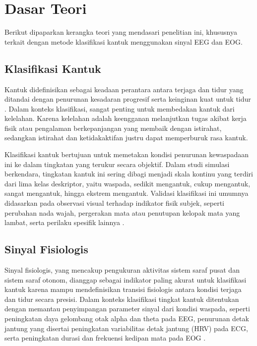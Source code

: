 \section{Dasar Teori} \label{II.Teori}
Berikut dipaparkan kerangka teori yang mendasari penelitian ini, khususnya terkait dengan metode klasifikasi kantuk menggunakan sinyal EEG dan EOG. \par

\subsection{Klasifikasi Kantuk} \label{II.Teori1}
Kantuk didefinisikan sebagai keadaan perantara antara terjaga dan tidur yang ditandai dengan penurunan kesadaran progresif serta keinginan kuat untuk tidur \cite{slater2008definition}. Dalam konteks klasifikasi, sangat penting untuk membedakan kantuk dari kelelahan. Karena kelelahan adalah keengganan melanjutkan tugas akibat kerja fisik atau pengalaman berkepanjangan yang membaik dengan istirahat, sedangkan istirahat dan ketidakaktifan justru dapat memperburuk rasa kantuk.

Klasifikasi kantuk bertujuan untuk memetakan kondisi penurunan kewaspadaan ini ke dalam tingkatan yang terukur secara objektif. Dalam studi simulasi berkendara, tingkatan kantuk ini sering dibagi menjadi skala kontinu yang terdiri dari lima kelas deskriptor, yaitu waspada, sedikit mengantuk, cukup mengantuk, sangat mengantuk, hingga ekstrem mengantuk. Validasi klasifikasi ini umumnya didasarkan pada observasi visual terhadap indikator fisik subjek, seperti perubahan nada wajah, pergerakan mata atau penutupan kelopak mata yang lambat, serta perilaku spesifik lainnya \cite{khushaba2011driver}.

\subsection{Sinyal Fisiologis} \label{II.Teori1}
Sinyal fisiologis, yang mencakup pengukuran aktivitas sistem saraf pusat  dan sistem saraf otonom, dianggap sebagai indikator paling akurat untuk klasifikasi kantuk karena mampu mendefinisikan transisi fisiologis antara kondisi terjaga dan tidur secara presisi. Dalam konteks klasifikasi tingkat kantuk ditentukan dengan memantau penyimpangan parameter sinyal dari kondisi waspada, seperti peningkatan daya gelombang otak alpha dan theta pada EEG, penurunan detak jantung yang disertai peningkatan variabilitas detak jantung (HRV) pada ECG, serta peningkatan durasi dan frekuensi kedipan mata pada EOG \cite{8293771}.

